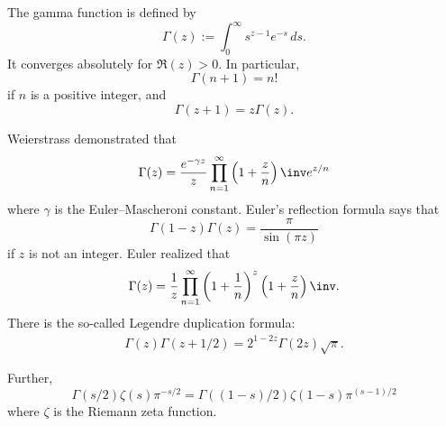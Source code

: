\documentclass [preview, border = 20pt] {standalone}
\begin{document}
\pagecolor{black}
\color{white}
The gamma function is defined by
\[
  \Gamma(z) := \int_0^\infty s^{z-1}e^{-s}\, ds.
\]
It converges absolutely for $\Re(z)>0$. In particular,
\[
  \Gamma(n+1) = n!
\]
if $n$ is a positive integer, and 
\[
  \Gamma(z+1) = z\Gamma(z).
\]

Weierstrass demonstrated that
\[
  \Gamma(z) = \frac{e^{-\gamma z}}{z} \prod_{n=1}^\infty \left(1+\frac z n\right)\inv e^{z/n}
\]
where $\gamma$ is the Euler--Mascheroni constant. Euler’s reflection formula says that
\[
  \Gamma(1-z)\Gamma(z) = \frac{\pi}{\sin(\pi z)}
\]
if $z$ is not an integer. Euler realized that
\[
  \Gamma(z) = \frac{1}{z} \prod_{n=1}^\infty \left(1+\frac 1 n\right)^z \left(1+\frac z n\right)\inv.
\]
There is the so-called Legendre duplication formula:
\begin{align*}
  \Gamma(z) \Gamma(z+1/2) = 2^{1-2z}\Gamma(2z)\sqrt \pi.
\end{align*}

Further,
\[
  \Gamma(s/2)\zeta(s) \pi^{-s/2} = \Gamma((1-s)/2) \zeta(1-s)\pi^{(s-1)/2}
\]
where $\zeta$ is the Riemann zeta function.
\end{document}
